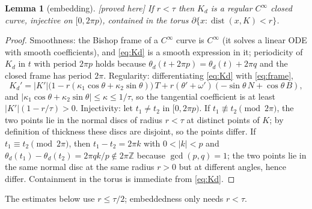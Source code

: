 \documentclass[10pt,a4paper]{article}
\theoremstyle{plain}
\newtheorem{lemma}[theorem]{Lemma}
\theoremstyle{definition}
\theoremstyle{remark}
\newcommand{\Z}{\mathbb{Z}}
\newcommand{\status}[1]{\textsf{\small [#1]}}
\begin{document}
\begin{lemma}[embedding]\label{lem:embed}\status{proved here}
If $r<\tau$ then $K_d$ is a regular $C^\infty$ closed curve, injective on $[0,2\pi p)$, contained in the torus $\partial\{x:\operatorname{dist}(x,K)<r\}$.
\end{lemma}
\begin{proof}
Smoothness: the Bishop frame of a $C^\infty$ curve is $C^\infty$ (it solves a linear ODE with smooth coefficients), and \eqref{eq:Kd} is a smooth expression in it; periodicity of $K_d$ in $t$ with period $2\pi p$ holds because $\theta_d(t+2\pi p)=\theta_d(t)+2\pi q$ and the closed frame has period $2\pi$. Regularity: differentiating \eqref{eq:Kd} with \eqref{eq:frame},
\begin{equation}\label{eq:deriv}
K_d'=|K'|\bigl(1-r(\kappa_1\cos\theta+\kappa_2\sin\theta)\bigr)\,T+r(\theta'+\omega')(-\sin\theta\,N+\cos\theta\,B),
\end{equation}
and $|\kappa_1\cos\theta+\kappa_2\sin\theta|\le\kappa\le1/\tau$, so the tangential coefficient is at least $|K'|(1-r/\tau)>0$. Injectivity: let $t_1\neq t_2$ in $[0,2\pi p)$. If $t_1\not\equiv t_2\pmod{2\pi}$, the two points lie in the normal discs of radius $r<\tau$ at distinct points of $K$; by definition of thickness these discs are disjoint, so the points differ. If $t_1\equiv t_2\pmod{2\pi}$, then $t_1-t_2=2\pi k$ with $0<|k|<p$ and $\theta_d(t_1)-\theta_d(t_2)=2\pi qk/p\notin2\pi\Z$ because $\gcd(p,q)=1$; the two points lie in the same normal disc at the same radius $r>0$ but at different angles, hence differ. Containment in the torus is immediate from \eqref{eq:Kd}.
\end{proof}

The estimates below use $r\le\tau/2$; embeddedness only needs $r<\tau$.
\end{document}

